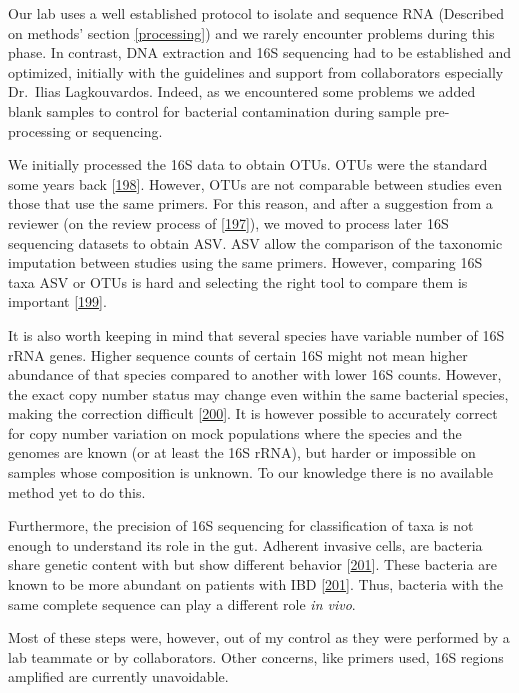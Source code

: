 \documentclass[
  12pt,
  a4paper,
  twoside,
  openright]{book}
\begin{document}
Our lab uses a well established protocol to isolate and sequence RNA (Described on methods' section \ref{processing}) and we rarely encounter problems during this phase.
In contrast, DNA extraction and 16S sequencing had to be established and optimized, initially with the guidelines and support from collaborators especially Dr.~Ilias Lagkouvardos.
Indeed, as we encountered some problems we added blank samples to control for bacterial contamination during sample pre-processing or sequencing.

We initially processed the 16S data to obtain OTUs.
OTUs were the standard some years back {[}\protect\hyperlink{ref-callahan2017}{198}{]}.
However, OTUs are not comparable between studies even those that use the same primers.
For this reason, and after a suggestion from a reviewer (on the review process of {[}\protect\hyperlink{ref-revilla2021}{197}{]}), we moved to process later 16S sequencing datasets to obtain ASV.
ASV allow the comparison of the taxonomic imputation between studies using the same primers.
However, comparing 16S taxa ASV or OTUs is hard and selecting the right tool to compare them is important {[}\protect\hyperlink{ref-nearing2022}{199}{]}.

It is also worth keeping in mind that several species have variable number of 16S rRNA genes.
Higher sequence counts of certain 16S might not mean higher abundance of that species compared to another with lower 16S counts.
However, the exact copy number status may change even within the same bacterial species, making the correction difficult {[}\protect\hyperlink{ref-louca2018}{200}{]}.
It is however possible to accurately correct for copy number variation on mock populations where the species and the genomes are known (or at least the 16S rRNA), but harder or impossible on samples whose composition is unknown.
To our knowledge there is no available method yet to do this.

Furthermore, the precision of 16S sequencing for classification of taxa is not enough to understand its role in the gut.
Adherent invasive cells, are bacteria share genetic content with but show different behavior {[}\protect\hyperlink{ref-nadalian2021}{201}{]}.
These bacteria are known to be more abundant on patients with IBD {[}\protect\hyperlink{ref-nadalian2021}{201}{]}.
Thus, bacteria with the same complete sequence can play a different role \emph{in vivo}.

Most of these steps were, however, out of my control as they were performed by a lab teammate or by collaborators.
Other concerns, like primers used, 16S regions amplified are currently unavoidable.
\end{document}
